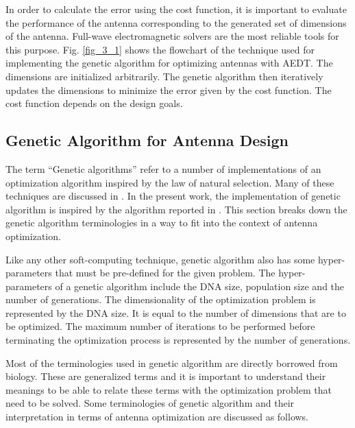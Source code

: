 In order to calculate the error using the cost function, it is important to evaluate the performance of the antenna corresponding to the generated set of dimensions of the antenna. Full-wave electromagnetic solvers are the most reliable tools for this purpose. Fig. \ref{fig_3_1} shows the flowchart of the technique used for implementing the genetic algorithm for optimizing antennas with AEDT. The dimensions are initialized arbitrarily. The genetic algorithm then iteratively updates the dimensions to minimize the error given by the cost function. The cost function depends on the design goals.

\subsection{Genetic Algorithm for Antenna Design}
The term ``Genetic algorithms'' refer to a number of implementations of an optimization algorithm inspired by the law of natural selection. Many of these techniques are discussed in \cite{gaBook}. In the present work, the implementation of genetic algorithm is inspired by the algorithm reported in \cite{gaImpl}. This section breaks down the genetic algorithm terminologies in a way to fit into the context of antenna optimization.

Like any other soft-computing technique, genetic algorithm also has some hyper-parameters that must be pre-defined for the given problem. The hyper-parameters of a genetic algorithm include the DNA size, population size and the number of generations. The dimensionality of the optimization problem is represented by the DNA size. It is equal to the number of dimensions that are to be optimized. The maximum number of iterations to be performed before terminating the optimization process is represented by the number of generations.

Most of the terminologies used in genetic algorithm are directly borrowed from biology. These are generalized terms and it is important to understand their meanings to be able to relate these terms with the optimization problem that need to be solved. Some terminologies of genetic algorithm and their interpretation in terms of antenna optimization are discussed as follows.

